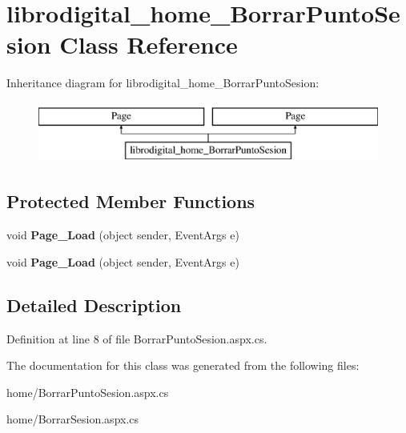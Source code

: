 \hypertarget{classlibrodigital__home___borrar_punto_sesion}{}\section{librodigital\+\_\+home\+\_\+\+Borrar\+Punto\+Sesion Class Reference}
\label{classlibrodigital__home___borrar_punto_sesion}
Inheritance diagram for librodigital\+\_\+home\+\_\+\+Borrar\+Punto\+Sesion\+:\begin{figure}[H]
\begin{center}
\leavevmode
\includegraphics[height=2.000000cm]{classlibrodigital__home___borrar_punto_sesion}
\end{center}
\end{figure}
\subsection*{Protected Member Functions}
\begin{DoxyCompactItemize}
\item 
void {\bfseries Page\+\_\+\+Load} (object sender, Event\+Args e)\hypertarget{classlibrodigital__home___borrar_punto_sesion_abefe92276fd24d95ea3920f908ba7062}{}\label{classlibrodigital__home___borrar_punto_sesion_abefe92276fd24d95ea3920f908ba7062}

\item 
void {\bfseries Page\+\_\+\+Load} (object sender, Event\+Args e)\hypertarget{classlibrodigital__home___borrar_punto_sesion_abefe92276fd24d95ea3920f908ba7062}{}\label{classlibrodigital__home___borrar_punto_sesion_abefe92276fd24d95ea3920f908ba7062}

\end{DoxyCompactItemize}


\subsection{Detailed Description}


Definition at line 8 of file Borrar\+Punto\+Sesion.\+aspx.\+cs.



The documentation for this class was generated from the following files\+:\begin{DoxyCompactItemize}
\item 
home/Borrar\+Punto\+Sesion.\+aspx.\+cs\item 
home/Borrar\+Sesion.\+aspx.\+cs\end{DoxyCompactItemize}
